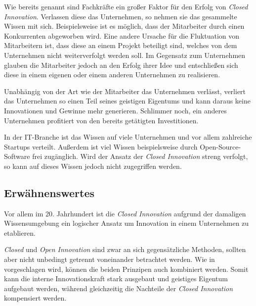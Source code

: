 Wie bereits genannt sind Fachkräfte ein großer Faktor für den Erfolg von \textit{Closed Innovation}.
Verlassen diese das Unternehmen, so nehmen sie das gesammelte Wissen mit sich.
Beispielsweise ist es möglich, dass der Mitarbeiter durch einen Konkurrenten abgeworben wird.
Eine andere Ursache für die Fluktuation von Mitarbeitern ist,
dass diese an einem Projekt beteiligt sind,
welches von dem Unternehmen nicht weiterverfolgt werden soll.
Im Gegensatz zum Unternehmen glauben die Mitarbeiter jedoch an den Erfolg ihrer Idee
und entschließen sich diese in einem eigenen oder einem anderen Unternehmen zu realisieren.

Unabhängig von der Art wie der Mitarbeiter das Unternehmen verlässt,
verliert das Unternehmen so einen Teil seines geistigen Eigentums
und kann daraus keine Innovationen und Gewinne mehr generieren.
Schlimmer noch, ein anderes Unternehmen profitiert von den bereits getätigten Investitionen.

In der IT-Branche ist das Wissen auf viele Unternehmen und vor allem zahlreiche Startups verteilt.
Außerdem ist viel Wissen beispielsweise durch Open-Source-Software frei zugänglich.
Wird der Ansatz der \textit{Closed Innovation} streng verfolgt,
so kann auf dieses Wissen jedoch nicht zugegriffen werden.

\subsection{Erwähnenswertes}\label{sec:bewertung-erw}
Vor allem im 20. Jahrhundert ist die \textit{Closed Innovation}
aufgrund der damaligen Wissensumgebung
ein logischer Ansatz um Innovation in einem Unternehmen zu etablieren.

\textit{Closed} und \textit{Open Innovation} sind zwar an sich gegensätzliche Methoden,
sollten aber nicht unbedingt getrennt voneinander betrachtet werden.
Wie in \cite{OpenInno32:online} vorgeschlagen wird,
können die beiden Prinzipen auch kombiniert werden.
Somit kann die interne Innovationskraft stark ausgebaut und geistiges Eigentum aufgebaut werden,
während gleichzeitig die Nachteile der \textit{Closed Innovation} kompensiert werden.
